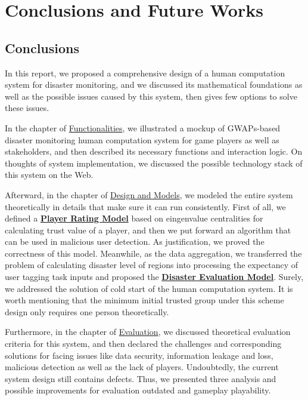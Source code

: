 \section{Conclusions and Future Works}

\subsection{Conclusions}

In this report, we proposed a comprehensive design of a human computation system for disaster monitoring,
and we discussed its mathematical foundations as well as the possible issues caused by this system,
then gives few options to solve these issues. 

In the chapter of \hyperref[chapter:func]{Functionalities}, 
we illustrated a mockup of GWAPs-based disaster monitoring
human computation system for game players as well as stakeholders, and then described its
necessary functions and interaction logic. On thoughts of system implementation, we discussed the possible technology stack of 
this system on the Web.

Afterward, in the chapter of \hyperref[chapter:design]{Design and Models}, we modeled the entire system theoretically in details 
that make sure it can run consistently. 
First of all, we defined a \textbf{\hyperref[chapter:prm]{Player Rating Model}} based on eingenvalue centralities
for calculating trust value of a player, and then we put forward an algorithm
that can be used in malicious user detection. As justification, we proved the correctness of this model.
Meanwhile, as the data aggregation, we transferred the problem of calculating disaster level of regions into
processing the expectancy of user tagging task inputs and proposed the \textbf{\hyperref[chapter:dem]{Disaster Evaluation Model}}.
Surely, we addressed the solution of cold start of the human computation system.
It is worth mentioning that the minimum initial trusted group under this scheme design only requires one person theoretically.

Furthermore, in the chapter of \hyperref[chapter:evaluation]{Evaluation}, we discussed theoretical evaluation criteria for this system,
and then declared the challenges and corresponding solutions for facing issues like data security, information leakage and loss, 
malicious detection as well as the lack of players.
Undoubtedly, the current system design still contains defects. 
Thus, we presented three analysis and possible improvements for evaluation outdated 
and gameplay playability. 

